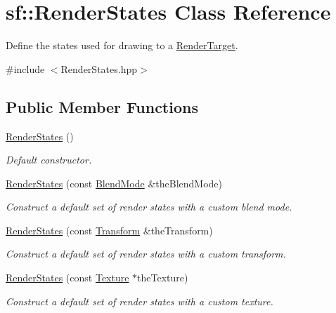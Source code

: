 \hypertarget{classsf_1_1_render_states}{}\section{sf\+:\+:Render\+States Class Reference}
\label{classsf_1_1_render_states}


Define the states used for drawing to a \hyperlink{classsf_1_1_render_target}{Render\+Target}.  




{\ttfamily \#include $<$Render\+States.\+hpp$>$}

\subsection*{Public Member Functions}
\begin{DoxyCompactItemize}
\item 
\hyperlink{classsf_1_1_render_states_a885bf14070d0d5391f062f62b270b7d0}{Render\+States} ()
\begin{DoxyCompactList}\small\item\em Default constructor. \end{DoxyCompactList}\item 
\hyperlink{classsf_1_1_render_states_acac8830a593c8a4523ac2fdf3cac8a01}{Render\+States} (const \hyperlink{structsf_1_1_blend_mode}{Blend\+Mode} \&the\+Blend\+Mode)
\begin{DoxyCompactList}\small\item\em Construct a default set of render states with a custom blend mode. \end{DoxyCompactList}\item 
\hyperlink{classsf_1_1_render_states_a3e99cad6ab05971d40357949930ed890}{Render\+States} (const \hyperlink{classsf_1_1_transform}{Transform} \&the\+Transform)
\begin{DoxyCompactList}\small\item\em Construct a default set of render states with a custom transform. \end{DoxyCompactList}\item 
\hyperlink{classsf_1_1_render_states_a8f4ca3be0e27dafea0c4ab8547439bb1}{Render\+States} (const \hyperlink{classsf_1_1_texture}{Texture} $\ast$the\+Texture)
\begin{DoxyCompactList}\small\item\em Construct a default set of render states with a custom texture. \end{DoxyCompactList}\item 

\end{DoxyCompactItemize}
